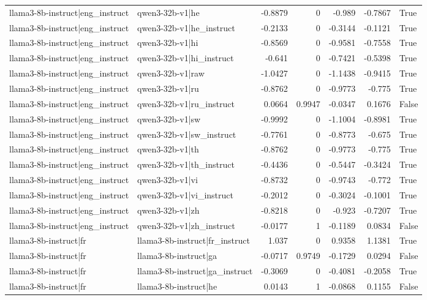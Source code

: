 \begin{table}
\begin{tabular}{l l r r r r l}
llama3-8b-instruct|eng_instruct & qwen3-32b-v1|he & -0.8879 & 0 & -0.989 & -0.7867 & True \\
llama3-8b-instruct|eng_instruct & qwen3-32b-v1|he_instruct & -0.2133 & 0 & -0.3144 & -0.1121 & True \\
llama3-8b-instruct|eng_instruct & qwen3-32b-v1|hi & -0.8569 & 0 & -0.9581 & -0.7558 & True \\
llama3-8b-instruct|eng_instruct & qwen3-32b-v1|hi_instruct & -0.641 & 0 & -0.7421 & -0.5398 & True \\
llama3-8b-instruct|eng_instruct & qwen3-32b-v1|raw & -1.0427 & 0 & -1.1438 & -0.9415 & True \\
llama3-8b-instruct|eng_instruct & qwen3-32b-v1|ru & -0.8762 & 0 & -0.9773 & -0.775 & True \\
llama3-8b-instruct|eng_instruct & qwen3-32b-v1|ru_instruct & 0.0664 & 0.9947 & -0.0347 & 0.1676 & False \\
llama3-8b-instruct|eng_instruct & qwen3-32b-v1|sw & -0.9992 & 0 & -1.1004 & -0.8981 & True \\
llama3-8b-instruct|eng_instruct & qwen3-32b-v1|sw_instruct & -0.7761 & 0 & -0.8773 & -0.675 & True \\
llama3-8b-instruct|eng_instruct & qwen3-32b-v1|th & -0.8762 & 0 & -0.9773 & -0.775 & True \\
llama3-8b-instruct|eng_instruct & qwen3-32b-v1|th_instruct & -0.4436 & 0 & -0.5447 & -0.3424 & True \\
llama3-8b-instruct|eng_instruct & qwen3-32b-v1|vi & -0.8732 & 0 & -0.9743 & -0.772 & True \\
llama3-8b-instruct|eng_instruct & qwen3-32b-v1|vi_instruct & -0.2012 & 0 & -0.3024 & -0.1001 & True \\
llama3-8b-instruct|eng_instruct & qwen3-32b-v1|zh & -0.8218 & 0 & -0.923 & -0.7207 & True \\
llama3-8b-instruct|eng_instruct & qwen3-32b-v1|zh_instruct & -0.0177 & 1 & -0.1189 & 0.0834 & False \\
llama3-8b-instruct|fr & llama3-8b-instruct|fr_instruct & 1.037 & 0 & 0.9358 & 1.1381 & True \\
llama3-8b-instruct|fr & llama3-8b-instruct|ga & -0.0717 & 0.9749 & -0.1729 & 0.0294 & False \\
llama3-8b-instruct|fr & llama3-8b-instruct|ga_instruct & -0.3069 & 0 & -0.4081 & -0.2058 & True \\
llama3-8b-instruct|fr & llama3-8b-instruct|he & 0.0143 & 1 & -0.0868 & 0.1155 & False \\

\end{tabular}
\end{table}
